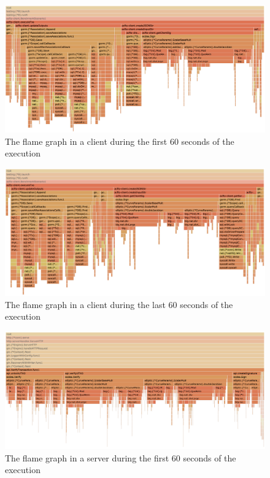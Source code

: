 \documentclass[a4paper, oneside]{discothesis}
\begin{document}
\begin{figure}[p]
    \begin{center}
        \includegraphics[width=\columnwidth]{figures/flame_graph_client_begining}
        \caption{The flame graph in a client during the first 60 seconds of the execution}
        \label{fig:fg-client-b}
    \end{center}
\end{figure}

\begin{figure}[p]
    \begin{center}
        \includegraphics[width=\columnwidth]{figures/flame_graph_client_ending}
        \caption{The flame graph in a client during the last 60 seconds of the execution}
        \label{fig:fg-client-e}
    \end{center}
\end{figure}


\begin{figure}[p]
    \begin{center}
        \includegraphics[width=\columnwidth]{figures/flame_graph_server_begining}
        \caption{The flame graph in a server during the first 60 seconds of the execution}
        \label{fig:fg-server-b}
    \end{center}
\end{figure}
\end{document}
